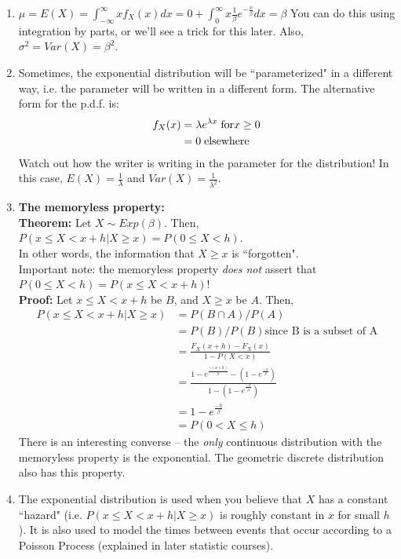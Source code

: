 \documentclass[12pt]{article}
\begin{document}
\begin{enumerate}
    \item $\mu = E(X) = \int_{-\infty}^{\infty} x f_X (x) dx = 0 + \int_0^{\infty} x \frac{1}{\beta} e^{-\frac{x}{\beta}} dx = \beta$
        You can do this using integration by parts, or we'll see a trick for this later. Also, $\sigma^2 = Var(X) = \beta^2$.
    \item Sometimes, the exponential distribution will be ``parameterized" in a different way, i.e. the parameter will be written in a different form. The alternative form for the p.d.f. is:
        \begin{align*}
            f_X (x) &= \lambda e^{\lambda x} \; \textnormal{for} x \geq 0 \\
                &= 0 \; \textnormal{elsewhere}
        \end{align*}
        Watch out how the writer is writing in the parameter for the distribution! In this case, $E(X) = \frac{1}{\lambda}$ and $Var(X) = \frac{1}{\lambda^2}$.
    \item \textbf{The memoryless property:} \\
        \textbf{Theorem:} Let $X \sim Exp(\beta)$. Then, $P(x \leq X < x+h | X \geq x) = P(0 \leq X < h)$. \\
        In other words, the information that $X \geq x$ is ``forgotten". \\
        Important note: the memoryless property \emph{does not} assert that $P(0 \leq X < h) = P(x \leq X < x+h)$! \\
        \textbf{Proof:} Let $x \leq X < x+h$ be $B$, and $X \geq x$ be $A$. Then,
            \begin{align*}
                P(x \leq X < x+h | X \geq x) &= P(B \cap A) / P(A) \\
                    &= P(B)/P(B) \text{since B is a subset of A} \\
                    &= \frac{F_X (x+h) - F_X (x)}{1 - P(X < x)} \\
                    &= \frac{1 - e^{\frac{-(x+h)}{\beta}} - (1 - e^{\frac{-x}{\beta}})}{1 - (1 - e^{\frac{-x}{\beta}})} \\
                    &= 1 - e^{\frac{-h}{\beta}} \\
                    &= P(0 < X \leq h)
            \end{align*}
        There is an interesting converse -- the \emph{only} continuous distribution with the memoryless property is the exponential. The geometric discrete distribution also has this property.
    \item The exponential distribution is used when you believe that $X$ has a constant ``hazard" (i.e. $P(x \leq X < x+h | X \geq x)$ is roughly constant in $x$ for small $h$). It is also used to model the times between events that occur according to a Poisson Process (explained in later statistic courses).

\end{enumerate}
\end{document}
